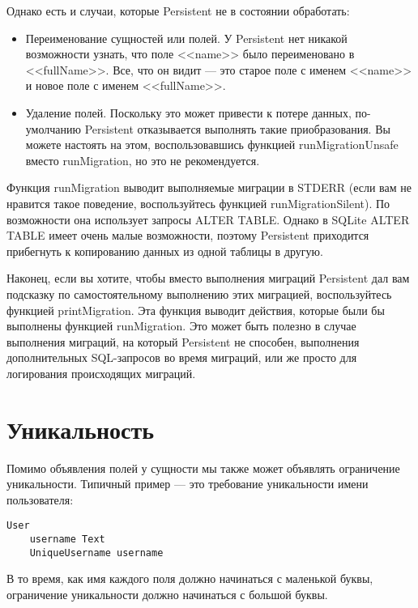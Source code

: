 Однако есть и случаи, которые Persistent не в состоянии обработать:

\begin{itemize}
	\item Переименование сущностей или полей. У Persistent нет никакой возможности узнать, что поле <<name>> было переименовано в <<fullName>>. Все, что он видит --- это старое поле с именем <<name>> и новое поле с именем <<fullName>>.
	\item Удаление полей. Поскольку это может привести к потере данных, по-умолчанию Persistent отказывается выполнять такие приобразования. Вы можете настоять на этом, воспользовавшись функцией runMigrationUnsafe вместо runMigration, но это не рекомендуется.
\end{itemize}

Функция runMigration выводит выполняемые миграции в STDERR (если вам не нравится такое поведение, воспользуйтесь функцией runMigrationSilent). По возможности она использует запросы ALTER TABLE. Однако в SQLite ALTER TABLE имеет очень малые возможности, поэтому Persistent приходится прибегнуть к копированию данных из одной таблицы в другую.

Наконец, если вы хотите, чтобы вместо выполнения миграций Persistent дал вам подсказку по самостоятельному выполнению этих миграцией, воспользуйтесь функцией printMigration. Эта функция выводит действия, которые были бы выполнены функцией runMigration. Это может быть полезно в случае выполнения миграций, на который Persistent не способен, выполнения дополнительных SQL-запросов во время миграций, или же просто для логирования происходящих миграций.

\section{Уникальность} %

Помимо объявления полей у сущности мы также может объявлять ограничение уникальности. Типичный пример --- это требование уникальности имени пользователя:

\begin{lstlisting}
User
    username Text
    UniqueUsername username
\end{lstlisting}

В то время, как имя каждого поля должно начинаться с маленькой буквы, ограничение уникальности должно начинаться с большой буквы.

